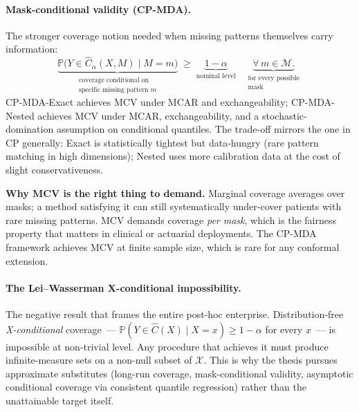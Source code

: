 \documentclass[letterpaper,11pt,leqno]{article}
\begin{document}
\paragraph{Mask-conditional validity (CP-MDA).} The stronger coverage notion needed when missing patterns themselves carry information:
\begin{equation*}
\underbrace{\mathbb{P}\bigl(Y \in \hat{C}_{\alpha}(X, M) \mid M = m\bigr)}_{\substack{\text{coverage conditional on}\\\text{specific missing pattern } m}}
\;\geq\;
\underbrace{1 - \alpha}_{\text{nominal level}}
\quad
\underbrace{\forall\, m \in \mathcal{M}.}_{\substack{\text{for every possible}\\\text{mask}}}
\end{equation*}
CP-MDA-Exact achieves MCV under MCAR and exchangeability; CP-MDA-Nested achieves MCV under MCAR, exchangeability, and a stochastic-domination assumption on conditional quantiles. The trade-off mirrors the one in CP generally: Exact is statistically tightest but data-hungry (rare pattern matching in high dimensions); Nested uses more calibration data at the cost of slight conservativeness.

\begin{theoremexplain}
\textbf{Why MCV is the right thing to demand.} Marginal coverage averages over masks; a method satisfying it can still systematically under-cover patients with rare missing patterns. MCV demands coverage \emph{per mask}, which is the fairness property that matters in clinical or actuarial deployments. The CP-MDA framework achieves MCV at finite sample size, which is rare for any conformal extension.
\end{theoremexplain}

\paragraph{The Lei--Wasserman X-conditional impossibility.} The negative result that frames the entire post-hoc enterprise. Distribution-free \emph{X-conditional} coverage~--- $\mathbb{P}(Y \in \hat{C}(X) \mid X = x) \geq 1 - \alpha$ for every $x$~--- is impossible at non-trivial level. Any procedure that achieves it must produce infinite-measure sets on a non-null subset of $\mathcal{X}$. This is why the thesis pursues approximate substitutes (long-run coverage, mask-conditional validity, asymptotic conditional coverage via consistent quantile regression) rather than the unattainable target itself.
\end{document}
